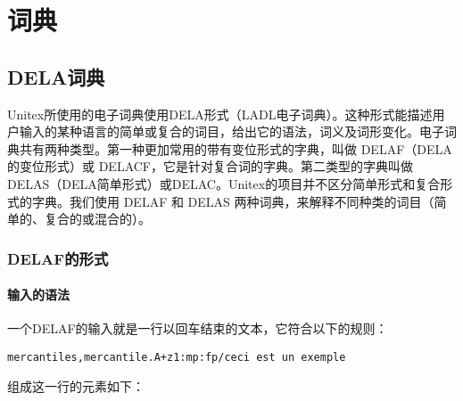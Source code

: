 \chapter{词典}
\label{chap-dictionaries}

\section{DELA词典}

Unitex所使用的电子词典使用DELA形式（LADL电子词典）。这种形式能描述用户输入的某种语言的简单或复合的词目，给出它的语法，词义及词形变化。电子词典共有两种类型。第一种更加常用的带有变位形式的字典，叫做 DELAF（DELA的变位形式）或 DELACF，它是针对复合词的字典。第二类型的字典叫做 DELAS（DELA简单形式）或DELAC。Unitex的项目并不区分简单形式和复合形式的字典。我们使用 DELAF 和 DELAS 两种词典，来解释不同种类的词目（简单的、复合的或混合的）。 

\subsection{DELAF的形式}
\label{section-DELAF-format}
\subsubsection{输入的语法}
\label{section-DELAF-entry-syntax}
一个DELAF的输入就是一行以回车结束的文本，它符合以下的规则：

\bigskip
\begin{verbatim}
mercantiles,mercantile.A+z1:mp:fp/ceci est un exemple
\end{verbatim}

\bigskip
\noindent 组成这一行的元素如下：

